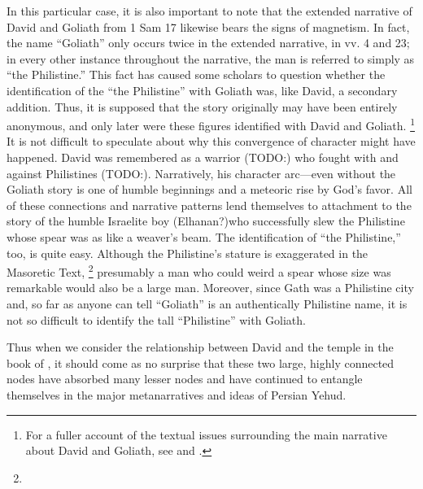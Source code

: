 In this particular case, it is also important to note that the extended narrative of David and Goliath from 1 Sam 17 likewise bears the signs of magnetism. In fact, the name ``Goliath'' only occurs twice in the extended narrative, in vv. 4 and 23; in every other instance throughout the narrative, the man is referred to simply as ``the Philistine.'' This fact has caused some scholars to question whether the identification of the ``the Philistine'' with Goliath was, like David, a secondary addition. Thus, it is supposed that the story originally may have been entirely anonymous, and only later were these figures identified with David and Goliath.%
    \footnote{For a fuller account of the textual issues surrounding the main narrative about David and Goliath, see \cite[280--309]{mccarter1980} and \cite[69--77]{mckenzie2000}.}
It is not difficult to speculate about why this convergence of character might have happened. David was remembered as a warrior (TODO:) who fought with and against Philistines (TODO:). Narratively, his character arc---even without the Goliath story is one of humble beginnings and a meteoric rise by God's favor. All of these connections and narrative patterns lend themselves to attachment to the story of the humble Israelite boy (Elhanan?)who successfully slew the Philistine whose spear was as like a weaver's beam. The identification of ``the Philistine,'' too, is quite easy. Although the Philistine's stature is exaggerated in the Masoretic Text,%
    \footnote{}
presumably a man who could weird a spear whose size was remarkable would also be a large man. Moreover, since Gath was a Philistine city and, so far as anyone can tell ``Goliath'' is an authentically Philistine name, it is not so difficult to identify the tall ``Philistine'' with Goliath.

Thus when we consider the relationship between David and the temple in the book of \chronicles, it should come as no surprise that these two large, highly connected nodes have absorbed many lesser nodes and have continued to entangle themselves in the major metanarratives and ideas of Persian Yehud.


